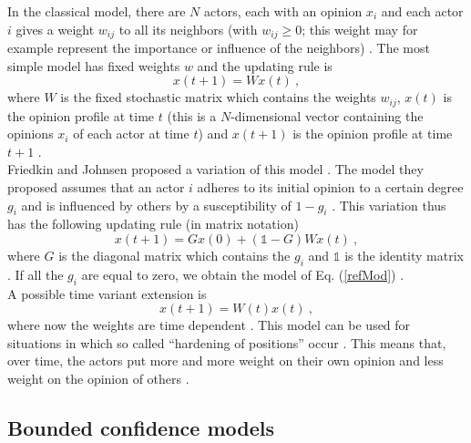 \documentclass[11 pt , letterpaper , twoside , openright]{book}
\begin{document}
In the classical model, there are $N$ actors, each with an opinion $x_i$ and each actor $i$ gives a weight $w_{ij}$ to all its neighbors (with $w_{ij} \geqslant 0$; this weight may for example represent the importance or influence of the neighbors) \cite{Krause2002}. The most simple model has fixed weights $w$ and the updating rule is
\begin{equation}\label{refMod}
	x(t+1) = W x(t) \ ,
\end{equation}
where $W$ is the fixed stochastic matrix which contains the weights $w_{ij}$, $x(t)$ is the opinion profile at time $t$ (this is a $N$-dimensional vector containing the opinions $x_i$ of each actor at time $t$) and $x(t+1)$ is the opinion profile at time $t+1$ \cite{Krause2002}.\\
\newline
Friedkin and Johnsen proposed a variation of this model \cite{Friedkin1990}\cite{Friedkin1999}. The model they proposed assumes that an actor $i$ adheres to its initial opinion to a certain degree $g_i$ and is influenced by others by a susceptibility of $1-g_i$ \cite{Krause2002}. This variation thus has the following updating rule (in matrix notation)
\begin{equation}
	x(t+1) = Gx(0) + (\mathbb{1}-G)Wx(t) \ ,
\end{equation}
where $G$ is the diagonal matrix which contains the $g_i$ and $\mathbb{1}$ is the identity matrix  \cite{Krause2002}. If all the $g_i$ are equal to zero, we obtain the model of Eq. (\ref{refMod}) \cite{Krause2002}.\\
\newline
A possible time variant extension is
\begin{equation}
	x(t+1) = W(t)x(t) \ ,
\end{equation}
where now the weights are time dependent \cite{Krause2002}. This model can be used for situations in which so called ``hardening of positions'' occur \cite{Krause2002}. This means that, over time, the actors put more and more weight on their own opinion and less weight on the opinion of others \cite{Krause2002}. 

\subsection{Bounded confidence models}\label{bounded}
\end{document}
